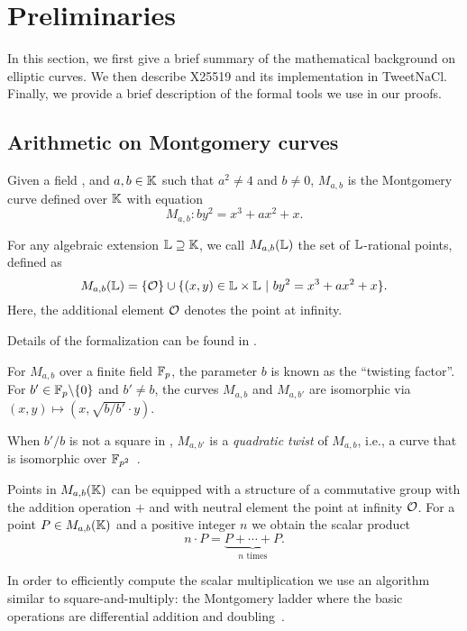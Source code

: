 \section{Preliminaries}
\label{sec:preliminaries}

In this section, we first give a brief summary of the mathematical background
on elliptic curves. We then describe X25519 and its implementation in TweetNaCl.
Finally, we provide a brief description of the formal tools we use in our proofs.


\subsection{Arithmetic on Montgomery curves}
\label{subsec:arithmetic-montgomery}

\begin{dfn}
  Given a field \K, and $a,b \in \mathbb{K}$ such that $a^2 \neq 4$ and $b \neq 0$,
  $M_{a,b}$ is the Montgomery curve defined over $\mathbb{K}$ with equation
  $$M_{a,b}: by^2 = x^3 + ax^2 + x.$$
\end{dfn}

\begin{dfn}
  For any algebraic extension $\mathbb{L} \supseteq	\mathbb{K}$, we call
  $M_{a,b}(\mathbb{L})$ the set of $\mathbb{L}$-rational points, defined as
  $$M_{a,b}(\mathbb{L}) = \{\mathcal{O}\} \cup \{(x,y) \in \mathbb{L} \times \mathbb{L}~|~by^2 = x^3 + ax^2 + x\}.$$
  Here, the additional element $\mathcal{O}$ denotes the point at infinity.
\end{dfn}
Details of the formalization can be found in .

For $M_{a,b}$ over a finite field $\mathbb{F}_{p}$, the parameter $b$ is known as the ``twisting factor''.
For $b'\in \mathbb{F}_{p}\backslash\{0\}$ and $b' \neq b$, the curves $M_{a,b}$ and $M_{a,b'}$
are isomorphic via $(x,y) \mapsto (x, \sqrt{b/b'} \cdot y)$.

\begin{dfn}
  When $b'/b$ is not a square in , $M_{a,b'}$ is a \emph{quadratic twist} of $M_{a,b}$, i.e.,
  a curve that is isomorphic over $\mathbb{F}_{p^2}$~\cite{cryptoeprint:2017:212}.
\end{dfn}

Points in $M_{a,b}(\mathbb{K})$ can be equipped with a structure of a commutative group
with the addition operation $+$ and with neutral element the point at infinity $\mathcal{O}$.
For a point $P \in M_{a,b}(\mathbb{K})$ and a positive integer $n$ we obtain the scalar product
$$n\cdot P = \underbrace{P + \cdots + P}_{n\text{ times}}.$$

In order to efficiently compute the scalar multiplication we use an algorithm
similar to square-and-multiply: the Montgomery ladder where the basic operations
are differential addition and doubling~\cite{MontgomerySpeeding}.

